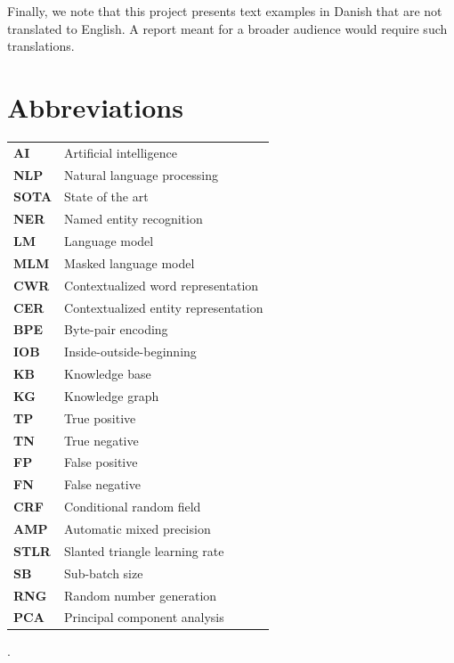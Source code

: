 \documentclass[12pt, fleqn]{report}
\newcommand{\abbrv}[2]{\vspace{0.2cm}\textbf{#1} & #2\\}
\begin{document}
Finally, we note that this project presents text examples in Danish that are not translated to English.
A report meant for a broader audience would require such translations.

\chapter*{Abbreviations}
\begin{table}[H]
    \begin{tabular}{@{}l l}
        \abbrv{AI}{Artificial intelligence}
        \abbrv{NLP}{Natural language processing}
        \abbrv{SOTA}{State of the art}
        \abbrv{NER}{Named entity recognition}
        \abbrv{LM}{Language model}
        \abbrv{MLM}{Masked language model}
        \abbrv{CWR}{Contextualized word representation}
        \abbrv{CER}{Contextualized entity representation}
        \abbrv{BPE}{Byte-pair encoding}
        \abbrv{IOB}{Inside-outside-beginning}
        \abbrv{KB}{Knowledge base}
        \abbrv{KG}{Knowledge graph}
        \abbrv{TP}{True positive}
        \abbrv{TN}{True negative}
        \abbrv{FP}{False positive}
        \abbrv{FN}{False negative}
        \abbrv{CRF}{Conditional random field}
        \abbrv{AMP}{Automatic mixed precision}
        \abbrv{STLR}{Slanted triangle learning rate}
        \abbrv{SB}{Sub-batch size}
        \abbrv{RNG}{Random number generation}
        \abbrv{PCA}{Principal component analysis}
    \end{tabular}
\end{table}\noindent

\tableofcontents

\setlength{\headheight}{15pt}
\addtolength{\topmargin}{-2.5pt}.















\renewcommand*{\bibfont}{\normalfont\footnotesize}
\printbibliography[heading=bibintoc]

\appendix

\end{document}
